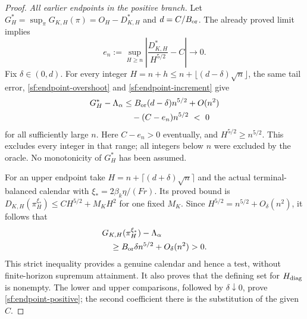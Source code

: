 \begin{proof}
\par\smallskip\noindent\emph{All earlier endpoints in the positive branch.}
Let $G_H^*=\sup_\pi G_{K,H}(\pi)=O_H-D_{K,H}^*$ and
$d=C/B_{\rm or}$. The already proved limit implies
\begin{equation}\label{sf:endpoint-tail}
e_n:=\sup_{H\ge n}
\left|\frac{D_{K,H}^*}{H^{5/2}}-C\right|\longrightarrow0.
\end{equation}
Fix $\delta\in(0,d)$. For every integer
$H=n+h\le n+\lfloor(d-\delta)\sqrt n\rfloor$, the same tail error,
\eqref{sf:endpoint-overshoot} and \eqref{sf:endpoint-increment} give
\begin{equation}\label{sf:endpoint-lower}
\begin{aligned}
G_H^*-\Lambda_\alpha
 &\le B_{\rm or}(d-\delta)n^{5/2}+O(n^2)\\
 &\quad -(C-e_n)n^{5/2}\ <\ 0
\end{aligned}
\end{equation}
for all sufficiently large $n$. Here $C-e_n>0$ eventually, and
$H^{5/2}\ge n^{5/2}$. This excludes every integer in that range;
all integers below $n$ were excluded by the oracle. No monotonicity of
$G_H^*$ has been assumed.

For an upper endpoint take
$H=n+\lceil(d+\delta)\sqrt n\rceil$ and the actual terminal-balanced
calendar with $\xi_*=2\beta_k\eta/(Fr)$. Its proved bound is
$D_{K,H}(\pi_H^{\xi_*})\le CH^{5/2}+M_KH^2$ for one fixed $M_K$.
Since $H^{5/2}=n^{5/2}+O_\delta(n^2)$, it follows that
\begin{equation}\label{sf:endpoint-upper}
\begin{aligned}
&G_{K,H}(\pi_H^{\xi_*})-\Lambda_\alpha\\
&\quad\ge B_{\rm or}\delta n^{5/2}+O_\delta(n^2)>0.
\end{aligned}
\end{equation}
This strict inequality provides a genuine calendar and hence a test,
without finite-horizon supremum attainment. It also proves that the defining
set for $H_{\rm diag}$ is nonempty. The lower and upper comparisons, followed
by $\delta\downarrow0$, prove \eqref{sf:endpoint-positive}; the second
coefficient there is the substitution of the given $C$.


\end{proof}
